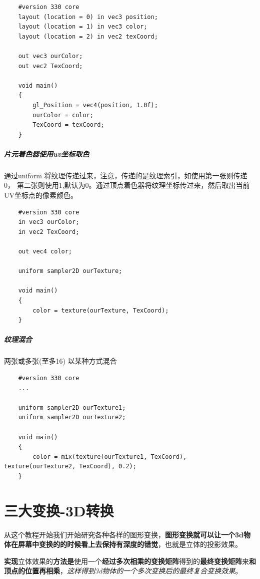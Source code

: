 \documentclass[UTF8,a4paper,12pt]{ctexbook}
\begin{document}
				\begin{lstlisting}
	#version 330 core
	layout (location = 0) in vec3 position;
	layout (location = 1) in vec3 color;
	layout (location = 2) in vec2 texCoord;
	
	out vec3 ourColor;
	out vec2 TexCoord;
	
	void main()
	{
	    gl_Position = vec4(position, 1.0f);
	    ourColor = color;
	    TexCoord = texCoord;
	}				
				\end{lstlisting}
				
			
			\paragraph{片元着色器使用uv坐标取色}
				
				通过uniform 将纹理传递过来，注意，传递的是纹理索引，如使用第一张则传递0， 第二张则使用1,默认为0。通过顶点着色器将纹理坐标传过来，然后取出当前UV坐标点的像素颜色。
			
				\begin{lstlisting}
	#version 330 core
	in vec3 ourColor;
	in vec2 TexCoord;
	
	out vec4 color;
	
	uniform sampler2D ourTexture;
	
	void main()
	{
	    color = texture(ourTexture, TexCoord);
	}				
				\end{lstlisting}
			
			
			\paragraph{纹理混合}
				两张或多张(至多16) 以某种方式混合
				
				\begin{lstlisting}
	#version 330 core
	...
	
	uniform sampler2D ourTexture1;
	uniform sampler2D ourTexture2;
	
	void main()
	{
	    color = mix(texture(ourTexture1, TexCoord), texture(ourTexture2, TexCoord), 0.2);
	}				
				\end{lstlisting}


\chapter{三大变换-3D转换}
	从这个教程开始我们开始研究各种各样的图形变换，\textbf{图形变换就可以让一个3d物体在屏幕中变换的的时候看上去保持有深度的错觉}，也就是立体的投影效果。
	
	\textbf{实现}立体效果的\textbf{方法是}使用一个\textbf{经过多次相乘的变换矩阵}得到的\textbf{最终变换矩阵}来\textbf{和顶点的位置再相乘}，\textit{这样得到3d物体的一个多次变换后的最终复合变换效果}。
	
\end{document}
